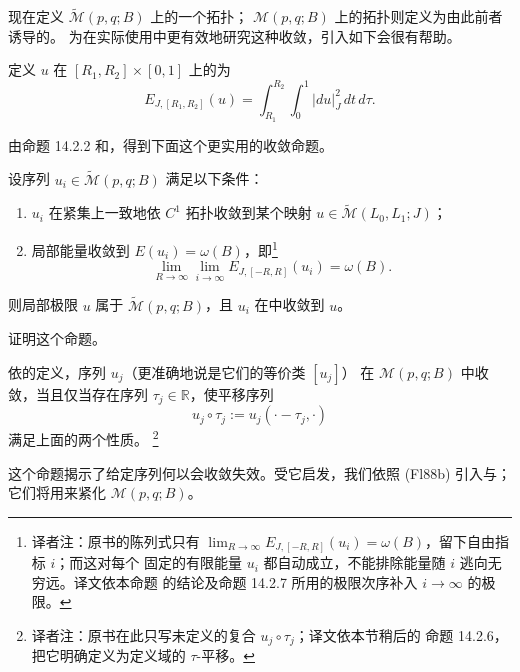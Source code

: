 现在定义 $\widetilde{\mathcal M}(p,q;B)$ 上的一个拓扑；
$\mathcal M(p,q;B)$ 上的拓扑则定义为由此前者诱导的\termQuotientTopology{}。
为在实际使用中更有效地研究这种收敛，引入如下\emph{\termLocalEnergy{}}会很有帮助。

\begin{definition}[\termLocalEnergy{}]
\label{def:local-energy}
定义 $u$ 在 $[R_1,R_2]\times[0,1]$ 上的\termLocalEnergy{}为
\[
  E_{J,[R_1,R_2]}(u)
  =
  \int_{R_1}^{R_2}\int_0^1|du|_J^2\,dt\,d\tau.
\]
\end{definition}

由命题 14.2.2 和\termBootstrapArgument{}，得到下面这个更实用的收敛命题。

\begin{proposition}
\label{prop:fine-convergence-criterion}
设序列 $u_i\in\widetilde{\mathcal M}(p,q;B)$ 满足以下条件：
\begin{enumerate}
  \item $u_i$ 在紧集上一致地依 $C^1$ 拓扑收敛到某个映射
  $u\in\widetilde{\mathcal M}(L_0,L_1;J)$；
  \item 局部能量收敛到 $E(u_i)=\omega(B)$，即\footnote{译者注：原书的陈列式只有
  $\lim_{R\to\infty}E_{J,[-R,R]}(u_i)=\omega(B)$，留下自由指标 $i$；而这对每个
  固定的有限能量 $u_i$ 都自动成立，不能排除能量随 $i$ 逃向无穷远。译文依本命题
  的结论及命题 14.2.7 所用的极限次序补入 $i\to\infty$ 的极限。}
  \[
    \lim_{R\to\infty}\lim_{i\to\infty}
    E_{J,[-R,R]}(u_i)=\omega(B).
  \]
\end{enumerate}
则局部极限 $u$ 属于 $\widetilde{\mathcal M}(p,q;B)$，且 $u_i$ 在\termFineCinfinityTopology{}中收敛到 $u$。
\end{proposition}

\begin{exercise}
\label{ex:fine-convergence-criterion}
证明这个命题。
\end{exercise}

依\termQuotientTopology{}的定义，序列 $u_j$（更准确地说是它们的等价类 $[u_j]$）
在 $\mathcal M(p,q;B)$ 中收敛，当且仅当存在序列 $\tau_j\in\mathbb R$，使平移序列
\[
  u_j\circ\tau_j
  :=u_j(\mathord\cdot-\tau_j,\mathord\cdot)
\]
满足上面的两个性质。
\footnote{译者注：原书在此只写未定义的复合 $u_j\circ\tau_j$；译文依本节稍后的
命题 14.2.6，把它明确定义为定义域的 $\tau$-平移。}

这个命题揭示了给定序列何以会收敛失效。受它启发，我们依照\personFloer{} (Fl88b)
引入\emph{\termCuspTrajectory{}}与\emph{\termBrokenCuspTrajectory{}}；它们将用来紧化
$\mathcal M(p,q;B)$。

